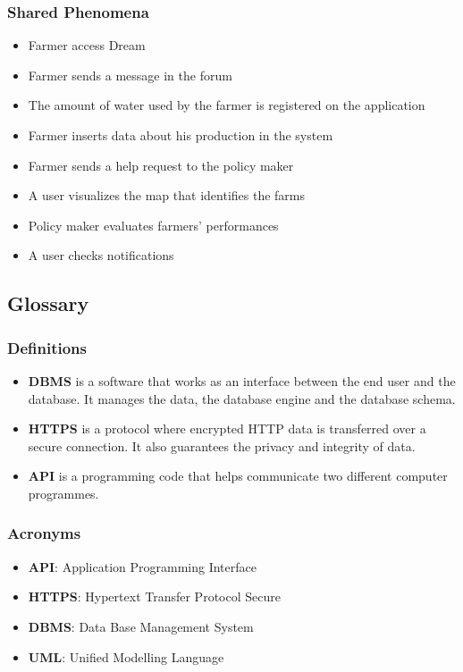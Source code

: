 \subsubsection{Shared Phenomena}

\begin{itemize}
    \item Farmer access Dream
    \item Farmer sends a message in the forum
    \item The amount of water used by the farmer is registered on the application
    \item Farmer inserts data about his production in the system
    \item Farmer sends a help request to the policy maker
    \item A user visualizes the map that identifies the farms
    \item Policy maker evaluates farmers' performances
    \item A user checks notifications
    
\end{itemize}

\subsection{Glossary}
\subsubsection{Definitions}
\begin{itemize}
        \item \textbf{DBMS} is a software that works as an interface between the end user and the database. It manages the data, the database engine and the database schema.
        \item \textbf{HTTPS} is a protocol where encrypted HTTP data is transferred over a secure connection. It also guarantees the privacy and integrity of data.
        \item \textbf{API} is a programming code that helps communicate two different computer programmes.
\end{itemize}
\subsubsection{Acronyms}
\begin{itemize}
        \item \textbf{API}: Application Programming Interface
        \item \textbf{HTTPS}: Hypertext Transfer Protocol Secure
        \item \textbf{DBMS}: Data Base Management System
        \item \textbf{UML}: Unified Modelling Language
\end{itemize}
